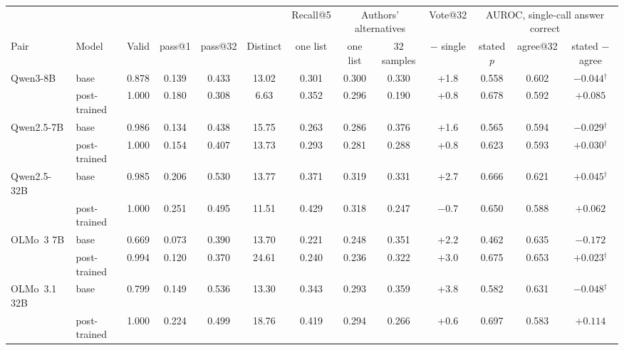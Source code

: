 \documentclass[11pt]{article}
\begin{document}
\begin{table}[t]
\centering\small
\begin{adjustbox}{max width=\linewidth}
\begin{tabular}{llccccccccccc}
\toprule
 & & & & & & Recall@5 & \multicolumn{2}{c}{Authors' alternatives} & Vote@32 & \multicolumn{3}{c}{AUROC, single-call answer correct} \\
Pair & Model & Valid & pass@1 & pass@32 & Distinct & one list & one list & 32 samples & $-$ single & stated $p$ & agree@32 & stated $-$ agree \\
\midrule
Qwen3-8B & base & 0.878 & 0.139 & 0.433 & 13.02 & 0.301 & 0.300 & 0.330 & +1.8 & 0.558 & 0.602 & $-0.044$$^{\dagger}$ \\
 & post-trained & 1.000 & 0.180 & 0.308 & 6.63 & 0.352 & 0.296 & 0.190 & +0.8 & 0.678 & 0.592 & $+0.085$ \\
Qwen2.5-7B & base & 0.986 & 0.134 & 0.438 & 15.75 & 0.263 & 0.286 & 0.376 & +1.6 & 0.565 & 0.594 & $-0.029$$^{\dagger}$ \\
 & post-trained & 1.000 & 0.154 & 0.407 & 13.73 & 0.293 & 0.281 & 0.288 & +0.8 & 0.623 & 0.593 & $+0.030$$^{\dagger}$ \\
Qwen2.5-32B & base & 0.985 & 0.206 & 0.530 & 13.77 & 0.371 & 0.319 & 0.331 & +2.7 & 0.666 & 0.621 & $+0.045$$^{\dagger}$ \\
 & post-trained & 1.000 & 0.251 & 0.495 & 11.51 & 0.429 & 0.318 & 0.247 & $-0.7$ & 0.650 & 0.588 & $+0.062$ \\
OLMo~3 7B & base & 0.669 & 0.073 & 0.390 & 13.70 & 0.221 & 0.248 & 0.351 & +2.2 & 0.462 & 0.635 & $-0.172$ \\
 & post-trained & 0.994 & 0.120 & 0.370 & 24.61 & 0.240 & 0.236 & 0.322 & +3.0 & 0.675 & 0.653 & $+0.023$$^{\dagger}$ \\
OLMo~3.1 32B & base & 0.799 & 0.149 & 0.536 & 13.30 & 0.343 & 0.293 & 0.359 & +3.8 & 0.582 & 0.631 & $-0.048$$^{\dagger}$ \\
 & post-trained & 1.000 & 0.224 & 0.499 & 18.76 & 0.419 & 0.294 & 0.266 & +0.6 & 0.697 & 0.583 & $+0.114$ \\
\bottomrule
\end{tabular}
\end{adjustbox}


\end{table}
\end{document}
